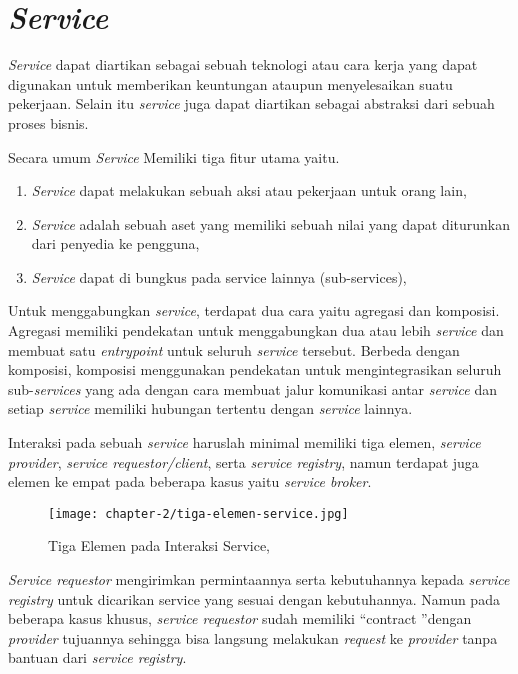 \section{\textit{Service}}

\textit{Service} dapat diartikan sebagai sebuah teknologi atau cara kerja yang dapat digunakan untuk memberikan keuntungan ataupun menyelesaikan suatu pekerjaan. Selain itu \textit{service} juga dapat diartikan sebagai abstraksi dari sebuah proses bisnis. \parencite{osullivan2002}

Secara umum \textit{Service} Memiliki tiga fitur utama yaitu.
\begin{enumerate}
  \item \textit{Service} dapat melakukan sebuah aksi atau pekerjaan untuk orang lain,
  \item \textit{Service} adalah sebuah aset yang memiliki sebuah nilai yang dapat diturunkan dari penyedia ke pengguna,
  \item \textit{Service} dapat di bungkus pada service lainnya (sub-services),
\end{enumerate}

Untuk menggabungkan \textit{service}, terdapat dua cara yaitu agregasi dan komposisi. Agregasi memiliki pendekatan untuk menggabungkan dua atau lebih \textit{service} dan membuat satu \textit{entrypoint} untuk seluruh \textit{service} tersebut. Berbeda dengan komposisi, komposisi menggunakan pendekatan untuk mengintegrasikan seluruh sub-\textit{services} yang ada dengan cara membuat jalur komunikasi antar \textit{service} dan setiap \textit{service} memiliki hubungan tertentu dengan \textit{service} lainnya.

Interaksi pada sebuah \textit{service} haruslah minimal memiliki tiga elemen, \textit{service provider}, \textit{service requestor/client}, serta \textit{\textit{service registry}}, namun terdapat juga elemen ke empat pada beberapa kasus yaitu \textit{service broker}.

\begin{figure}[ht]
  \centering
  \texttt{[image: chapter-2/tiga-elemen-service.jpg]}
  \caption{Tiga Elemen pada Interaksi Service, \parencite{abugessaisa2023}}
  \label{fig:tiga-elemen-service}
\end{figure}

\textit{Service requestor} mengirimkan permintaannya serta kebutuhannya kepada \textit{service registry} untuk dicarikan service yang sesuai dengan kebutuhannya. Namun pada beberapa kasus khusus, \textit{service requestor}
sudah memiliki \textquotedblleft contract \textquotedblright dengan \textit{provider} tujuannya sehingga bisa langsung melakukan \textit{request} ke \textit{provider} tanpa bantuan dari \textit{service registry}.

